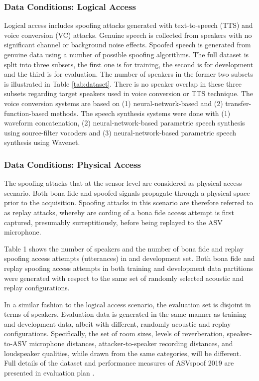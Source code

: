 \documentclass[a4paper]{article}
\begin{document}
\subsubsection{Data Conditions: Logical Access}
    Logical access includes spoofing attacks generated with text-to-speech (TTS) and voice conversion (VC) attacks. Genuine speech is collected from speakers with no significant channel or background noise effects. Spoofed speech is generated from genuine data using a number of possible spoofing algorithms. The full dataset is split into three subsets, the first one is for training, the second is for development and the third is for evaluation. The number of speakers in the former two subsets is illustrated in Table \ref{tab:dataset}. There is no speaker overlap in these three subsets regarding target speakers used in voice conversion or TTS technique. The voice conversion systems are based on (1) neural-network-based and (2) transfer-function-based methods. The speech synthesis systems were done with (1) waveform concatenation, (2) neural-network-based parametric speech synthesis using source-filter vocoders and (3) neural-network-based parametric speech synthesis using Wavenet.
    
\subsubsection{Data Conditions: Physical Access}
    The spoofing attacks that at the sensor level are considered as physical access scenario. Both bona fide and spoofed signals propagate through a physical space prior to the acquisition. Spoofing attacks in this scenario are therefore referred to as replay attacks, whereby are cording of a bona fide access attempt is first captured, presumably surreptitiously, before being replayed to the ASV microphone.
    
    Table 1 shows the number of speakers and the number of bona fide and replay spoofing access attempts (utterances) in and development set. Both bona fide and replay spoofing access attempts in both training and development data partitions were generated with respect to the same set of randomly selected acoustic and replay configurations.
    
    In a similar fashion to the logical access scenario, the evaluation set is disjoint in terms of speakers. Evaluation data is generated in the same manner as training and development data, albeit with different, randomly acoustic and replay configurations. Specifically, the set of room sizes,  levels of reverberation,  speaker-to-ASV microphone distances,  attacker-to-speaker recording distances, and loudspeaker qualities, while drawn from the same categories, will be different. Full details of the dataset and performance measures of ASVspoof 2019 are presented in evaluation plan \cite{evaluation}.
\end{document}
